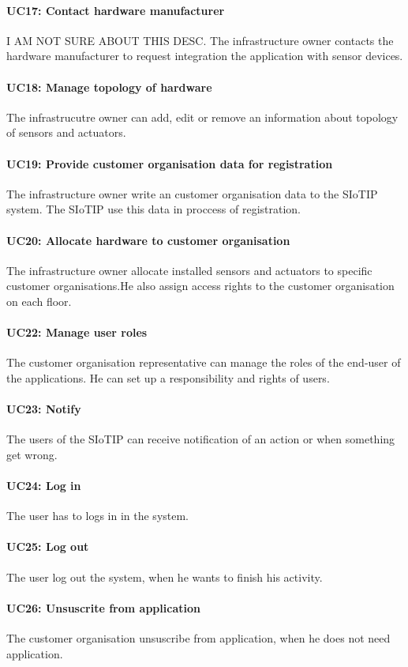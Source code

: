 \paragraph{UC17: Contact hardware manufacturer}
I AM NOT SURE ABOUT THIS DESC. The infrastructure owner contacts the hardware
manufacturer to request integration the application with sensor devices.
\paragraph{UC18: Manage topology of hardware}
The infrastrucutre owner can add, edit or remove an information about topology
of sensors and actuators.
\paragraph{UC19: Provide customer organisation data for registration}
The infrastructure owner write an customer organisation data to the SIoTIP system.
The SIoTIP use this data in proccess of registration.
\paragraph{UC20: Allocate hardware to customer organisation}
The infrastructure owner allocate installed sensors and actuators to specific customer
organisations.He also assign access rights to the customer organisation on each floor.
\paragraph{UC22: Manage user roles}
The customer organisation representative can manage the roles of the end-user of the applications.
He can set up a responsibility and rights of users.
\paragraph{UC23: Notify}
The users of the SIoTIP can receive notification of an action or when something get
wrong.
\paragraph{UC24: Log in}
The user has to logs in in the system.
\paragraph{UC25: Log out}
The user log out the system, when he wants to finish his activity.
\paragraph{UC26: Unsuscrite from application}
The customer organisation unsuscribe from application, when he does not need application.
